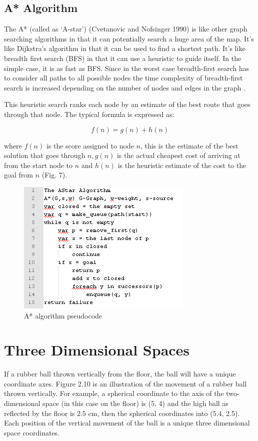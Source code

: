 \subsection{A* Algorithm}
The A* (called as ‘A-star’) (Cvetanovic and Nofsinger 1990) is like other graph searching algorithms in that it can potentially search a huge area of the map. It’s like Dijkstra’s algorithm in that it can be used to find a shortest path. It’s like breadth first search (BFS) in that it can use a heuristic to guide itself. In the simple case, it is as fast as BFS. Since in the worst case breadth-first search has to consider all paths to all possible nodes the time complexity of breadth-first search is increased depending on the number of nodes and edges in the graph \cite{sathyaraj2008multiple}.

This heuristic search ranks each node by an estimate of the best route that goes through that node. The typical formula is expressed as:

\begin{equation}\label{A-star-heuristic}
f(n) = g(n) + h(n)	
\end{equation}

where $f(n)$ is the score assigned to node $n$, this is the estimate of the best solution that goes through $n, g(n)$ is the actual cheapest cost of arriving at from the start node to $n$ and $h(n)$ is the heuristic estimate of the cost to the goal from $n$ (Fig. 7).

\begin{figure}[h!]
	\centering
	\includegraphics[scale=1]{figure9.png}
	\caption{A* algorithm pseudocode}
	\label{fig:figure9}
\end{figure}

\section{Three Dimensional Spaces}
If a rubber ball thrown vertically from the floor, the ball will have a unique coordinate axes. Figure 2.10 is an illustration of the movement of a rubber ball thrown vertically. For example, a spherical coordinate to the axis of the two-dimensional space (in this case on the floor) is (5, 4) and the high ball as reflected by the floor is 2.5 cm, then the spherical coordinates into (5.4, 2.5). Each position of the vertical movement of the ball is a unique three dimensional space coordinates. 

